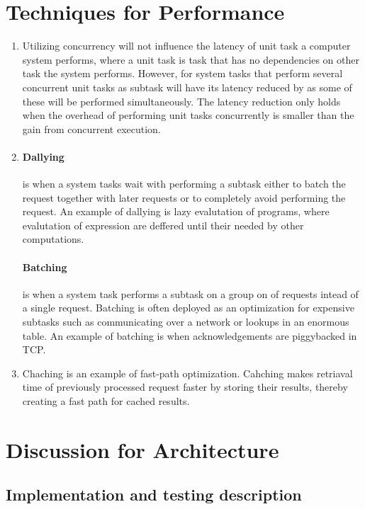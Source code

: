 \documentclass[a4paper]{article}
\begin{document}
\section{Techniques for Performance}
\begin{enumerate}
\item Utilizing concurrency will not influence the latency of unit task a computer system performs, where a unit task is task that has no dependencies on other task the system performs. However, for system tasks that perform several concurrent unit tasks as subtask will have its latency reduced by as some of these will be performed simultaneously. The latency reduction only holds when the overhead of performing unit tasks concurrently is smaller than the gain from concurrent execution.
\item \paragraph{Dallying} is when a system tasks wait with performing a subtask either to batch the request together with later requests or to completely avoid performing the request. An example of dallying is lazy evalutation of programs, where evalutation of expression are deffered until their needed by other computations.
\paragraph{Batching} is when a system task performs a subtask on a group on of requests intead of a single request. Batching is often deployed as an optimization for expensive subtasks such as communicating over a network or lookups in an enormous table. An example of batching is when acknowledgements are piggybacked in TCP.
\item Chaching is an example of fast-path optimization. Cahching makes retriaval time of previously processed request faster by storing their results, thereby creating a fast path for cached results.
\end{enumerate}
\section{Discussion for Architecture}
\subsection{Implementation and testing description}
\end{document}
